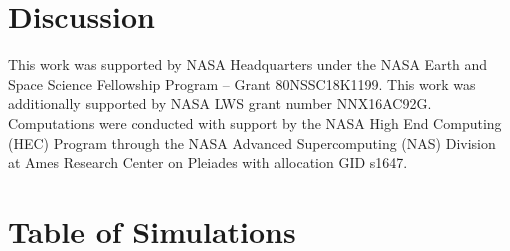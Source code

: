 \documentclass[twocolumn, amsmath, amsfonts, amssymb, trackchanges]{aastex62}
\begin{document}
\section{Discussion}
\label{sec:discussion}

\begin{acknowledgements}
This work was supported by NASA Headquarters under the NASA Earth and Space
Science Fellowship Program -- Grant 80NSSC18K1199.
This work was additionally supported by  NASA LWS grant number NNX16AC92G.  
Computations were conducted 
with support by the NASA High End Computing (HEC) Program through the NASA 
Advanced Supercomputing (NAS) Division at Ames Research Center on Pleiades
with allocation GID s1647.
\end{acknowledgements}


\appendix
\section{Table of Simulations}
\label{appendix:table}
\end{document}
